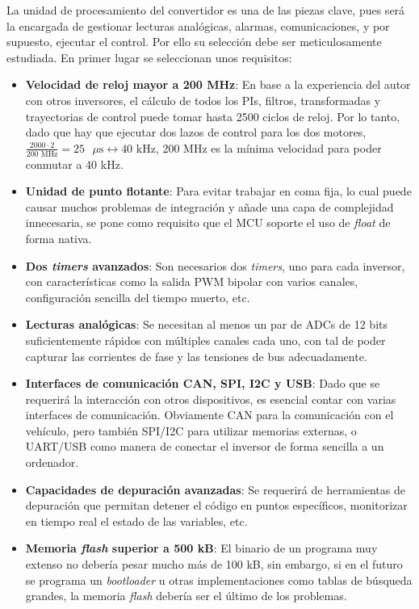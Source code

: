 La unidad de procesamiento del convertidor es una de las piezas clave, pues será la encargada de gestionar lecturas analógicas, alarmas, comunicaciones, y por supuesto, ejecutar el control. Por ello su selección debe ser meticulosamente estudiada. En primer lugar se seleccionan unos requisitos:

\begin{itemize}
	\item \textbf{Velocidad de reloj mayor a 200 MHz}: En base a la experiencia del autor con otros inversores, el cálculo de todos los PIs, filtros, transformadas y trayectorias de control puede tomar hasta 2500 ciclos de reloj. Por lo tanto, dado que hay que ejecutar dos lazos de control para los dos motores, $\frac{2000 \cdot 2}{200 \text{ MHz}} = 25 \text{ }\mu\text{s} \leftrightarrow 40 \text{ kHz}$, 200 MHz es la mínima velocidad para poder conmutar a 40 kHz.
	\item \textbf{Unidad de punto flotante}: Para evitar trabajar en coma fija, lo cual puede causar muchos problemas de integración y añade una capa de complejidad innecesaria, se pone como requisito que el MCU soporte el uso de \textit{float} de forma nativa.
	\item \textbf{Dos \textit{timers} avanzados}: Son necesarios dos \textit{timers}, uno para cada inversor, con características como la salida PWM bipolar con varios canales, configuración sencilla del tiempo muerto, etc.
	\item \textbf{Lecturas analógicas}: Se necesitan al menos un par de ADCs de 12 bits suficientemente rápidos con múltiples canales cada uno, con tal de poder capturar las corrientes de fase y las tensiones de bus adecuadamente.
	\item \textbf{Interfaces de comunicación CAN, SPI, I2C y USB}: Dado que se requerirá la interacción con otros dispositivos, es esencial contar con varias interfaces de comunicación. Obviamente CAN para la comunicación con el vehículo, pero también SPI/I2C para utilizar memorias externas, o UART/USB como manera de conectar el inversor de forma sencilla a un ordenador.
	\item \textbf{Capacidades de depuración avanzadas}: Se requerirá de herramientas de depuración que permitan detener el código en puntos específicos, monitorizar en tiempo real el estado de las variables, etc.
	\item \textbf{Memoria \textit{flash} superior a 500 kB}: El binario de un programa muy extenso no debería pesar mucho más de 100 kB, sin embargo, si en el futuro se programa un \textit{bootloader} u otras implementaciones como tablas de búsqueda grandes, la memoria \textit{flash} debería ser el último de los problemas.
	
\end{itemize}


